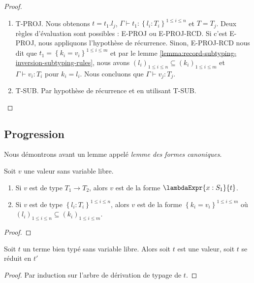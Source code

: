 \begin{proof}
\begin{enumerate}
         \item T-PROJ. Nous obtenons $t = t_{1}.l_{j}$, $\Gamma \vdash t_{1}
           : \left\{ l_{i} : T_{i} \right\}^{1 \leq i \leq n}$ et $T = T_{j}$.
           Deux règles d'évaluation sont possibles : E-PROJ ou E-PROJ-RCD. Si
           c'est E-PROJ, nous appliquons l'hypothèse de récurrence. Sinon,
           E-PROJ-RCD nous dit que $t_{1} = \left\{ k_{i} = v_{i} \right\}^{1
             \leq i \leq m}$ et par le lemme
           \ref{lemma:record-subtyping-inversion-subtyping-rules}, nous avons
           $(l_{i})_{1 \leq i \leq n} \subseteq (k_{i})_{1 \leq i \leq m}$ et
           $\Gamma \vdash v_{i} : T_{i}$ pour $k_{i} = l_{i}$. Nous concluons
           que $\Gamma \vdash v_{j} : T_{j}$.
           \item T-SUB. Par hypothèse de récurrence et en utilisant T-SUB.
  \end{enumerate}
\end{proof}

\subsection*{Progression}

Nous démontrons avant un lemme appelé \textit{lemme des formes canoniques}.

\begin{lemma} 
  Soit $v$ une valeur sans variable libre.
  \begin{enumerate}
  \item Si $v$ est de type $T_{1} \rightarrow T_{2}$, alors $v$ est de la forme $\lambdaExpr{x : S_{1}}{t}$.
    \item Si $v$ est de type $\left\{ l_{i} : T_{i} \right\}^{1 \leq i \leq n}$,
      alors $v$ est de la forme $\left\{ k_{i} = v_{i} \right\}^{1 \leq i \leq
        m}$ où $(l_{i})_{1 \leq i \leq n} \subseteq
      (k_{i})_{1 \leq i \leq m}$.
  \end{enumerate}
\end{lemma}

\begin{proof}
  
\end{proof}

\begin{theorem} [de progression] 
  Soit $t$ un terme bien typé sans variable libre. Alors soit $t$ est une
  valeur, soit $t$ se réduit en $t'$
\end{theorem}

\begin{proof}
  Par induction sur l'arbre de dérivation de typage de $t$.
\end{proof}

